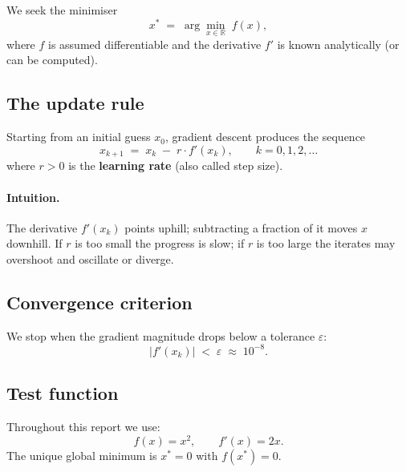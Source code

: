 \indent 
    
    We seek the minimiser
\[
  x^* \;=\; \arg\min_{x \in \mathbb{R}}\; f(x),
\]
where $f$ is assumed differentiable and the derivative $f'$ is known analytically
(or can be computed).

\subsection{The update rule}

Starting from an initial guess $x_0$, gradient descent produces the sequence
\[
  \boxed{x_{k+1} \;=\; x_k \;-\; r \cdot f'(x_k)}, \qquad k = 0, 1, 2, \ldots
\]
where $r > 0$ is the \textbf{learning rate} (also called step size).

\paragraph{Intuition.}
The derivative $f'(x_k)$ points uphill; subtracting a fraction of it moves
$x$ downhill.  If $r$ is too small the progress is slow; if $r$ is too large
the iterates may overshoot and oscillate or diverge.

\subsection{Convergence criterion}

We stop when the gradient magnitude drops below a tolerance $\varepsilon$:
\[
  |f'(x_k)| \;<\; \varepsilon \;\approx\; 10^{-8}.
\]

\subsection{Test function}

Throughout this report we use:
\[
  f(x) = x^2, \qquad f'(x) = 2x.
\]
The unique global minimum is $x^* = 0$ with $f(x^*) = 0$.